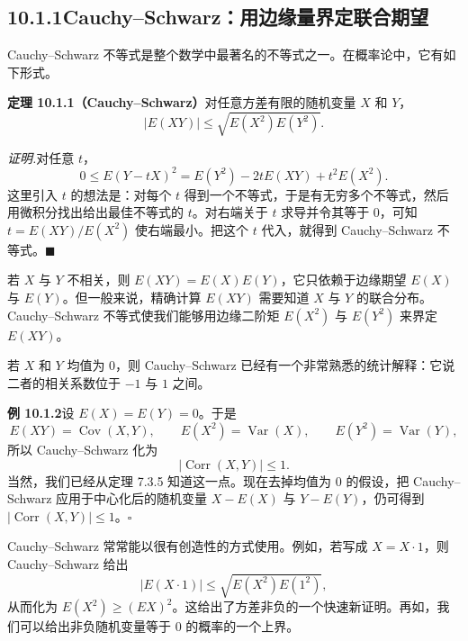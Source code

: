 \documentclass[UTF8, 12pt, fontset=fandol, oneside]{ctexart}
\begin{document}
\subsection*{10.1.1\quad Cauchy--Schwarz：用边缘量界定联合期望}

Cauchy--Schwarz 不等式是整个数学中最著名的不等式之一。在概率论中，它有如下形式。

\noindent\textbf{定理 10.1.1（Cauchy--Schwarz）}\quad 对任意方差有限的随机变量 $X$ 和 $Y$，
\[
  |E(XY)|\le \sqrt{E(X^2)E(Y^2)}.
\]

\noindent\textit{证明.}\quad 对任意 $t$，
\[
  0\le E(Y-tX)^2=E(Y^2)-2tE(XY)+t^2E(X^2).
\]
这里引入 $t$ 的想法是：对每个 $t$ 得到一个不等式，于是有无穷多个不等式，然后用微积分找出给出最佳不等式的 $t$。对右端关于 $t$ 求导并令其等于 $0$，可知 $t=E(XY)/E(X^2)$ 使右端最小。把这个 $t$ 代入，就得到 Cauchy--Schwarz 不等式。$\blacksquare$

若 $X$ 与 $Y$ 不相关，则 $E(XY)=E(X)E(Y)$，它只依赖于边缘期望 $E(X)$ 与 $E(Y)$。但一般来说，精确计算 $E(XY)$ 需要知道 $X$ 与 $Y$ 的联合分布。Cauchy--Schwarz 不等式使我们能够用边缘二阶矩 $E(X^2)$ 与 $E(Y^2)$ 来界定 $E(XY)$。

若 $X$ 和 $Y$ 均值为 $0$，则 Cauchy--Schwarz 已经有一个非常熟悉的统计解释：它说二者的相关系数位于 $-1$ 与 $1$ 之间。

\noindent\textbf{例 10.1.2}\quad 设 $E(X)=E(Y)=0$。于是
\[
  E(XY)=\operatorname{Cov}(X,Y),\qquad
  E(X^2)=\operatorname{Var}(X),\qquad
  E(Y^2)=\operatorname{Var}(Y),
\]
所以 Cauchy--Schwarz 化为
\[
  |\operatorname{Corr}(X,Y)|\le 1.
\]
当然，我们已经从定理 7.3.5 知道这一点。现在去掉均值为 $0$ 的假设，把 Cauchy--Schwarz 应用于中心化后的随机变量 $X-E(X)$ 与 $Y-E(Y)$，仍可得到 $|\operatorname{Corr}(X,Y)|\le 1$。$\square$

Cauchy--Schwarz 常常能以很有创造性的方式使用。例如，若写成 $X=X\cdot 1$，则 Cauchy--Schwarz 给出
\[
  |E(X\cdot 1)|\le \sqrt{E(X^2)E(1^2)},
\]
从而化为 $E(X^2)\ge (EX)^2$。这给出了方差非负的一个快速新证明。再如，我们可以给出非负随机变量等于 $0$ 的概率的一个上界。
\end{document}
